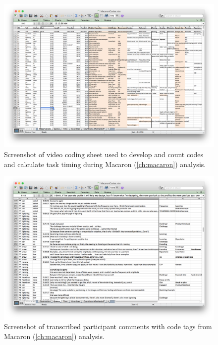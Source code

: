 	\begin{figure}[htbp] %
	   \centering
	   \includegraphics[width=0.9\textheight,angle=90]{Chapter99-SupportingMaterials/MethodExamples/MacaronCoding} 
	   \caption{Screenshot of video coding sheet used to develop and count codes and calculate task timing during Macaron (\autoref{ch:macaron}) analysis.}
	   \label{fig:SupportingMaterials:MethodExamples:MacaronCoding}
	\end{figure}


	\begin{figure}[htbp] %
	   \centering
	   \includegraphics[width=0.9\textheight,angle=90]{Chapter99-SupportingMaterials/MethodExamples/MacaronQuotes} 
	   \caption{Screenshot of transcribed participant comments with code tags from Macaron (\autoref{ch:macaron}) analysis.}
	   \label{fig:SupportingMaterials:MethodExamples:MacaronQuotes}
	\end{figure}





\endinput